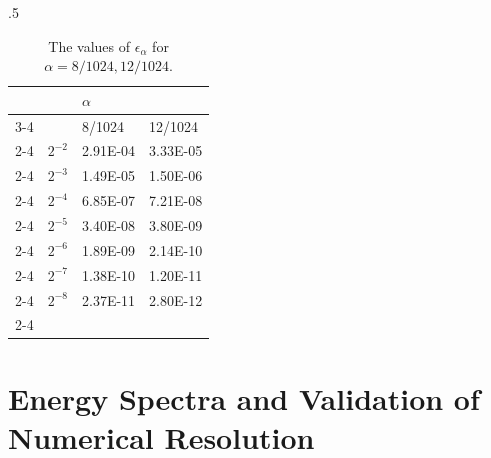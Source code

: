 \begin{table}[!htb]
\begin{subtable}{.5\linewidth}
\begin{tabular}{llll}
                                &                               & $\alpha$                                              &                                                       \\ \cline{3-4} 
                                & \multicolumn{1}{l|}{}         & \multicolumn{1}{l|}{8/1024}                           & \multicolumn{1}{l|}{12/1024}                          \\ \cline{2-4} 
\multicolumn{1}{l|}{}           & \multicolumn{1}{l|}{$2^{-2}$} & \multicolumn{1}{l|}{\cellcolor[HTML]{C0C0C0}2.91E-04} & \multicolumn{1}{l|}{\cellcolor[HTML]{C0C0C0}3.33E-05} \\ \cline{2-4} 
\multicolumn{1}{l|}{}           & \multicolumn{1}{l|}{$2^{-3}$} & \multicolumn{1}{l|}{1.49E-05}                         & \multicolumn{1}{l|}{1.50E-06}                         \\ \cline{2-4} 
\multicolumn{1}{l|}{}           & \multicolumn{1}{l|}{$2^{-4}$} & \multicolumn{1}{l|}{\cellcolor[HTML]{C0C0C0}6.85E-07} & \multicolumn{1}{l|}{\cellcolor[HTML]{C0C0C0}7.21E-08} \\ \cline{2-4} 
\multicolumn{1}{l|}{$\Delta t$} & \multicolumn{1}{l|}{$2^{-5}$} & \multicolumn{1}{l|}{3.40E-08}                         & \multicolumn{1}{l|}{3.80E-09}                         \\ \cline{2-4} 
\multicolumn{1}{l|}{}           & \multicolumn{1}{l|}{$2^{-6}$} & \multicolumn{1}{l|}{\cellcolor[HTML]{C0C0C0}1.89E-09} & \multicolumn{1}{l|}{\cellcolor[HTML]{C0C0C0}2.14E-10} \\ \cline{2-4} 
\multicolumn{1}{l|}{}           & \multicolumn{1}{l|}{$2^{-7}$} & \multicolumn{1}{l|}{1.38E-10}                         & \multicolumn{1}{l|}{1.20E-11}                         \\ \cline{2-4} 
\multicolumn{1}{l|}{}           & \multicolumn{1}{l|}{$2^{-8}$} & \multicolumn{1}{l|}{\cellcolor[HTML]{C0C0C0}2.37E-11} & \multicolumn{1}{l|}{\cellcolor[HTML]{C0C0C0}2.80E-12} \\ \cline{2-4} 
\end{tabular}
\caption{$N=256^3, 512^3, 1024^3$}
    \end{subtable} 
    \caption{The values of $\epsilon_{\alpha}$ for $\alpha=8/1024,12/1024$.}
    \label{tbl:alpha:energy:2}
\end{table}

\section{Energy Spectra and Validation of Numerical Resolution}


